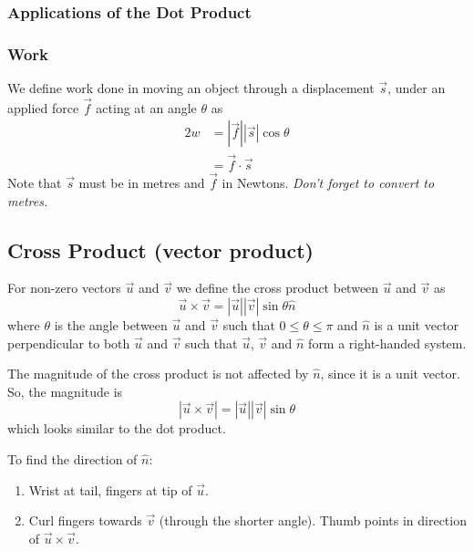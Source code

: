\documentclass[letterpaper, 12pt]{report}
\theoremstyle{definition}
\numberwithin{equation}{section}
\begin{document}
\subsubsection{Applications of the Dot Product}
\subsubsection*{Work}
We define work done in moving an object through a displacement $\vec s$, under an applied force $\vec f$ acting at an angle $\theta$ as
\begin{alignat}{2}
	w &= |\vec f||\vec s|\cos \theta \\
		&= \vec f \cdot \vec s
\end{alignat}
Note that $\vec s$ must be in metres and $\vec f$ in Newtons. \emph{Don't forget to convert to metres.}

\subsection{Cross Product (vector product)}
For non-zero vectors $\vec u$ and $\vec v$ we define the cross product between $\vec u$ and $\vec v$ as
\begin{equation}
	\vec u \times \vec v = |\vec u||\vec v|\sin \theta \hat n
\end{equation}
where $\theta$ is the angle between $\vec u$ and $\vec v$ such that $0 \le \theta \le \pi$ and $\hat n$ is a unit vector perpendicular to both $\vec u$ and $\vec v$ such that $\vec u$, $\vec v$ and $\hat n$ form a right-handed system.

The magnitude of the cross product is not affected by $\hat n$, since it is a unit vector. So, the magnitude is
\begin{equation}
	|\vec u \times \vec v| = |\vec u||\vec v|\sin \theta
\end{equation}
which looks similar to the dot product.

\bigskip \noindent
To find the direction of $\hat n$:
\begin{enumerate}
	\item Wrist at tail, fingers at tip of $\vec u$.
	\item Curl fingers towards $\vec v$ (through the shorter angle). Thumb points in direction of $\vec u \times \vec v$.
\end{enumerate}
\end{document}
